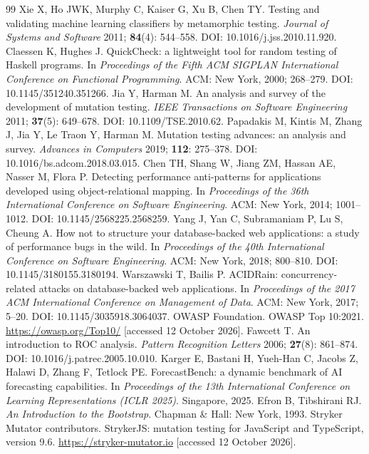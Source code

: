 \begin{thebibliography}{99}
 Xie X, Ho JWK, Murphy C, Kaiser G, Xu B, Chen TY. Testing and validating machine learning classifiers by metamorphic testing. \emph{Journal of Systems and Software} 2011; \textbf{84}(4): 544--558. DOI: 10.1016/j.jss.2010.11.920.
 Claessen K, Hughes J. QuickCheck: a lightweight tool for random testing of Haskell programs. In \emph{Proceedings of the Fifth ACM SIGPLAN International Conference on Functional Programming}. ACM: New York, 2000; 268--279. DOI: 10.1145/351240.351266.
 Jia Y, Harman M. An analysis and survey of the development of mutation testing. \emph{IEEE Transactions on Software Engineering} 2011; \textbf{37}(5): 649--678. DOI: 10.1109/TSE.2010.62.
 Papadakis M, Kintis M, Zhang J, Jia Y, Le Traon Y, Harman M. Mutation testing advances: an analysis and survey. \emph{Advances in Computers} 2019; \textbf{112}: 275--378. DOI: 10.1016/bs.adcom.2018.03.015.
 Chen TH, Shang W, Jiang ZM, Hassan AE, Nasser M, Flora P. Detecting performance anti-patterns for applications developed using object-relational mapping. In \emph{Proceedings of the 36th International Conference on Software Engineering}. ACM: New York, 2014; 1001--1012. DOI: 10.1145/2568225.2568259.
 Yang J, Yan C, Subramaniam P, Lu S, Cheung A. How not to structure your database-backed web applications: a study of performance bugs in the wild. In \emph{Proceedings of the 40th International Conference on Software Engineering}. ACM: New York, 2018; 800--810. DOI: 10.1145/3180155.3180194.
 Warszawski T, Bailis P. ACIDRain: concurrency-related attacks on database-backed web applications. In \emph{Proceedings of the 2017 ACM International Conference on Management of Data}. ACM: New York, 2017; 5--20. DOI: 10.1145/3035918.3064037.
 OWASP Foundation. OWASP Top 10:2021. \url{https://owasp.org/Top10/} [accessed 12 October 2026].
 Fawcett T. An introduction to ROC analysis. \emph{Pattern Recognition Letters} 2006; \textbf{27}(8): 861--874. DOI: 10.1016/j.patrec.2005.10.010.
 Karger E, Bastani H, Yueh-Han C, Jacobs Z, Halawi D, Zhang F, Tetlock PE. ForecastBench: a dynamic benchmark of AI forecasting capabilities. In \emph{Proceedings of the 13th International Conference on Learning Representations (ICLR 2025)}. Singapore, 2025.
 Efron B, Tibshirani RJ. \emph{An Introduction to the Bootstrap}. Chapman \& Hall: New York, 1993.
 Stryker Mutator contributors. StrykerJS: mutation testing for JavaScript and TypeScript, version 9.6. \url{https://stryker-mutator.io} [accessed 12 October 2026].

\end{thebibliography}
